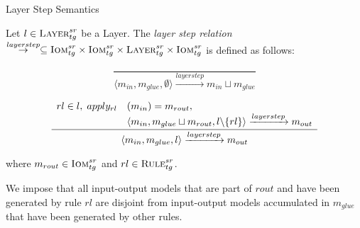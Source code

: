 

\begin{definition} {Layer Step Semantics}
\label{def:layer_step_semantics}

Let $l\in \textsc{Layer}^{sr}_{tg}$ be a Layer. The \emph{layer step relation}
$\stackrel{layerstep}{\rightarrow}\subseteq \textsc{Iom}^{sr}_{tg}\times \textsc{Iom}^{sr}_{tg} \times \textsc{Layer}^{sr}_{tg}\times
\textsc{Iom}^{sr}_{tg}$ is defined as follows:

$$\frac{}
{\langle m_{in},m_{glue},\emptyset\rangle \xrightarrow{layerstep}m_{in} \sqcup m_{glue}}$$

\begin{multline*}
\frac{\begin{array}{ll} rl\in l,\; apply_{rl}&(m_{in}) = m_{rout},\\
&\langle m_{in},m_{glue}\sqcup m_{rout},l\backslash \{rl\}\rangle \xrightarrow{layerstep} m_{out}
\end{array}}
{\langle m_{in},m_{glue},l\rangle \xrightarrow{layerstep} m_{out}}$$
\end{multline*}

\begin{center}
where $m_{rout} \in\textsc{Iom}^{sr}_{tg}$ and $rl\in \textsc{Rule}^{sr}_{tg}$.
\end{center}
 
We impose that all input-output models that are part of $rout$ and have been generated by rule $rl$ are disjoint from input-output models accumulated in $m_{glue}$ that have been generated by other rules.

\end{definition}


